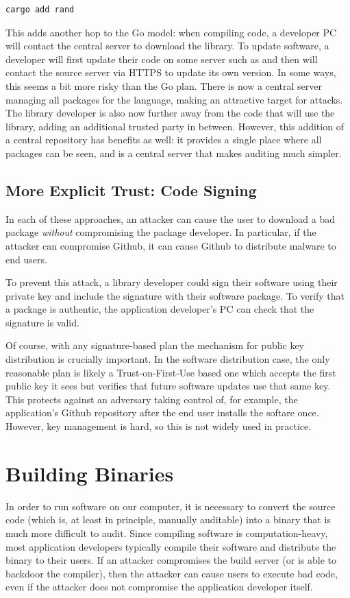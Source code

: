 \begin{lstlisting}[language=sh]
	cargo add rand
\end{lstlisting}

This adds another hop to the Go model: when compiling code, a developer PC will contact the central server  to download the library. To update software, a developer will first update their code on some server such as  and then  will contact the source server via HTTPS to update its own version. In some ways, this seems a bit more risky than the Go plan. There is now a central server managing all packages for the language, making an attractive target for attacks. The library developer is also now further away from the code that will use the library, adding an additional trusted party in between. However, this addition of a central repository has benefits as well: it provides a single place where all packages can be seen, and is a central server that makes auditing much simpler.
\fi

\subsection{More Explicit Trust: Code Signing}
In each of these approaches, an attacker can cause the user to download
a bad package \emph{without} compromising the package developer.
In particular, if the attacker can compromise Github, it can 
cause Github to distribute malware to end users.

To prevent this attack, a library developer could
sign their software using their private key and
include the signature with their 
software package. To verify that a package is authentic,
the application developer's PC can check that the signature is
valid. 

Of course, with any signature-based plan the mechanism for public key distribution is crucially important. In the software distribution case, the only reasonable plan is likely a Trust-on-First-Use based one which accepts the first public key it sees but verifies that future software updates use that same key. This protects against an adversary taking control of, for example, the application's Github repository after the end user installs the softare once. However, key management is hard, so this is not widely used in practice.

\section{Building Binaries}
In order to run software on our computer, it is
necessary to convert the source code (which is, at
least in principle, manually auditable) into
a binary that is much more difficult to audit.
Since compiling software is computation-heavy,
most application developers typically 
compile their software and distribute the binary
to their users. 
If an attacker compromises the build server
(or is able to backdoor the compiler),
then the attacker can cause users to execute
bad code, even if the attacker does not compromise
the application developer itself.

